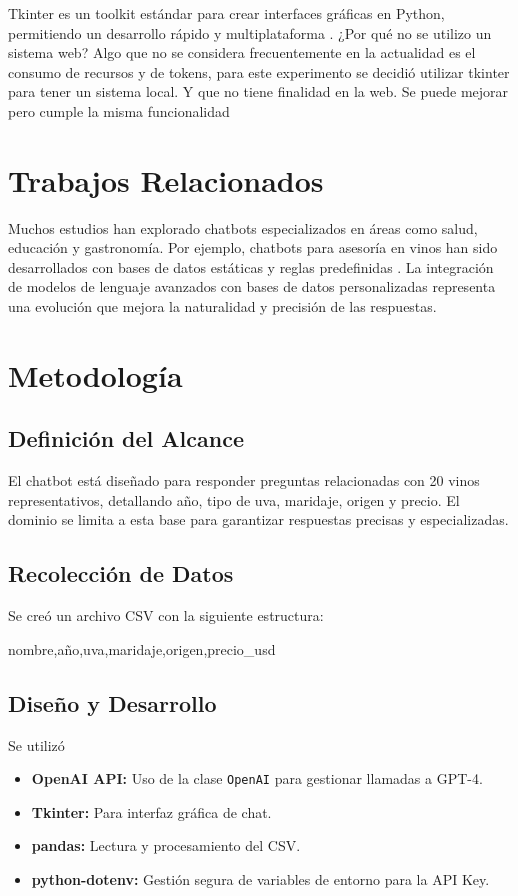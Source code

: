 \documentclass[conference]{IEEEtran}
\begin{document}
Tkinter es un toolkit estándar para crear interfaces gráficas en Python,
permitiendo un desarrollo rápido y multiplataforma \cite{lundh2001python}.
¿Por qué no se utilizo un sistema web? Algo que no se considera frecuentemente
en la actualidad es el consumo de recursos y de tokens,
para este experimento se decidió utilizar tkinter para tener un sistema
local. Y que no tiene finalidad en la web. Se puede mejorar pero cumple la misma
funcionalidad


\section{Trabajos Relacionados}
Muchos estudios han explorado chatbots especializados en áreas como salud,
educación y gastronomía. Por ejemplo, chatbots para asesoría en vinos han sido
desarrollados con bases de datos estáticas y reglas predefinidas
\cite{vinbot2019}. La integración de modelos de lenguaje avanzados con bases de
datos personalizadas representa una evolución que mejora la naturalidad y
precisión de las respuestas.

\section{Metodología}

\subsection{Definición del Alcance}
El chatbot está diseñado para responder preguntas relacionadas con 20 vinos
representativos, detallando año, tipo de uva, maridaje, origen y precio. El
dominio se limita a esta base para garantizar respuestas precisas y
especializadas.

\subsection{Recolección de Datos}
Se creó un archivo CSV con la siguiente estructura:

nombre,año,uva,maridaje,origen,precio\_usd

\subsection{Diseño y Desarrollo}

Se utilizó
\begin{itemize}
    \item \textbf{OpenAI API:} Uso de la clase \texttt{OpenAI} para gestionar llamadas a GPT-4.
    \item \textbf{Tkinter:} Para interfaz gráfica de chat.
    \item \textbf{pandas:} Lectura y procesamiento del CSV.
    \item \textbf{python-dotenv:} Gestión segura de variables de entorno para la API Key.
\end{itemize}
\end{document}
